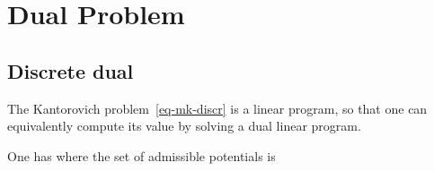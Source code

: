 
\section{Dual Problem}

\subsection{Discrete dual}


The Kantorovich problem~\eqref{eq-mk-discr} is a linear program, so that one can equivalently compute its value by solving a dual linear program. 


\begin{prop}\label{prop-duality-discr}
One has
\eql{\label{eq-dual}
	\MKD_\C(\a,\b) = 
	\umax{(\fD,\gD) \in \PotentialsD(\a,\b)} \dotp{\fD}{\a} + \dotp{\gD}{\b} 
}
where the set of admissible potentials is
\end{prop}

